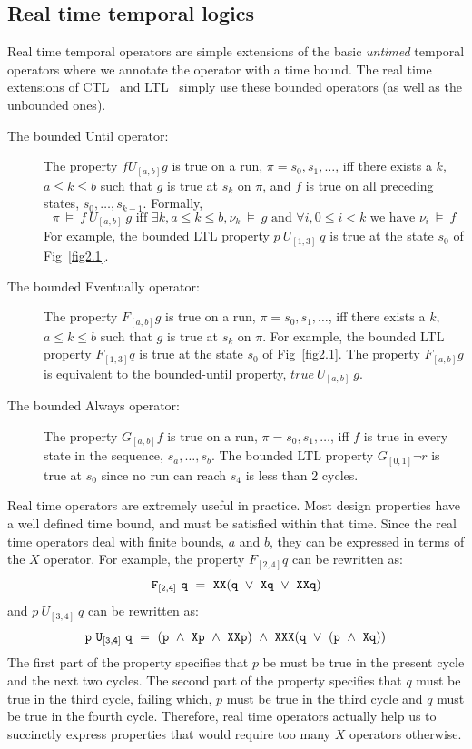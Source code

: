 \subsection{Real time temporal logics} \label{sec2.1.3}
\noindent
Real time temporal operators are simple extensions of the basic
{\em untimed} temporal operators where we annotate the operator with a time
bound. The real time extensions of CTL~\cite{emerson:89} and 
LTL~\cite{alur:94} 
simply use these bounded operators (as well as the unbounded ones). 
\begin{description}

\item[The bounded Until operator: ] 
	The property $f U_{[a,b]} g$ is true on
	a run, $\pi = s_0, s_1, \ldots$, iff there exists a $k$, 
	$a \leq k \leq b$ such that $g$ is true at $s_k$ on $\pi$, and $f$
	is true on all preceding states, $s_0, \ldots, s_{k-1}$. Formally,
	\[ \pi\ \models\ f\ U_{[a,b]}\ g \mbox{ iff } \exists k,
	a \leq k \leq b, \nu_k\ \models\ g \mbox{ and } 
	\forall i, 0 \leq i < k \mbox{ we have } \nu_i\ \models\ f \]
	For example, the bounded LTL property $p\ U_{[1,3]}\ q$ is true at the state
	$s_0$ of Fig~\ref{fig2.1}. 

\item[The bounded Eventually operator: ] The property $F_{[a,b]} g$ is true
	on a run, $\pi = s_0, s_1, \ldots$, iff there exists a $k$,
	$a \leq k \leq b$ such that $g$ is true at $s_k$ on $\pi$.
	For example, the bounded LTL property $F_{[1,3]} q$ is true at the
	state $s_0$ of Fig~\ref{fig2.1}. The property $F_{[a,b]} g$ is
	equivalent to the bounded-until property, $true\ U_{[a,b]}\ g$. 

\item[The bounded Always operator: ] The property $G_{[a,b]} f$ is true
	on a run, $\pi = s_0, s_1, \ldots$, iff $f$ is true in every
	state in the sequence, $s_a, \ldots, s_b$. The bounded LTL property
	$G_{[0,1]} \neg r$ is true at $s_0$ since no run can reach $s_4$
	is less than 2 cycles.

\end{description}
\noindent
Real time operators are extremely useful in practice. Most design properties
have a well defined time bound, and must be satisfied within that time.
Since the real time operators deal with finite bounds, $a$ and $b$, they
can be expressed in terms of the $X$ operator. For example, the property
$F_{[2,4]} q$ can be rewritten as:
\[ {\tt F_{[2,4]}\ q\ =\ XX(q\ \lor\ Xq\ \lor\ XXq)} \]
and $p\ U_{[3,4]}\ q$ can be rewritten as:
\[ {\tt p\ U_{[3,4]}\ q\ =\ (p\ \land\ Xp\ \land\  XXp)\ \land\ 
	XXX(q\ \lor\ (p\ \land\ Xq))} \]
The first part of the property specifies that $p$ be must be true in the
present cycle and the next two cycles. The second part of the property
specifies that $q$ must be true in the third cycle, failing which, $p$
must be true in the third cycle and $q$ must be true in the fourth cycle.
Therefore, real time operators actually help us to succinctly express
properties that would require too many $X$ operators otherwise.

